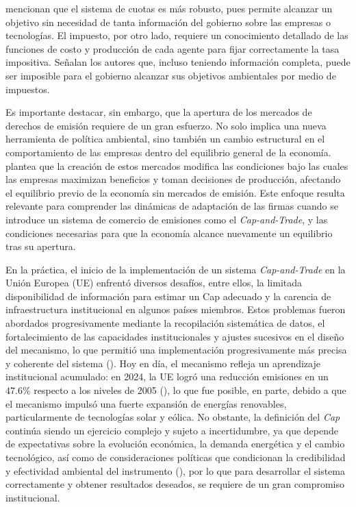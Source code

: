  mencionan que el sistema de cuotas es más robusto, pues permite alcanzar un objetivo sin necesidad de tanta información del gobierno sobre las empresas o tecnologías. El impuesto, por otro lado, requiere un conocimiento detallado de las funciones de costo y producción de cada agente para fijar correctamente la tasa impositiva. Señalan los autores que, incluso teniendo información completa, puede ser imposible para el gobierno alcanzar sus objetivos ambientales por medio de impuestos.\medskip 

Es importante destacar, sin embargo, que la apertura de los mercados de derechos de emisión requiere de un gran esfuerzo. No solo implica una nueva herramienta de política ambiental, sino también un cambio estructural en el comportamiento de las empresas dentro del equilibrio general de la economía.  plantea que la creación de estos mercados modifica las condiciones bajo las cuales las empresas maximizan beneficios y toman decisiones de producción, afectando el equilibrio previo de la economía sin mercados de emisión. Este enfoque resulta relevante para comprender las dinámicas de adaptación de las firmas cuando se introduce un sistema de comercio de emisiones como el \emph{Cap-and-Trade}, y las condiciones necesarias para que la economía alcance nuevamente un equilibrio tras su apertura.\medskip

En la práctica, el inicio de la implementación de un sistema \emph{Cap-and-Trade} en la Unión Europea (UE) enfrentó diversos desafíos, entre ellos, la limitada disponibilidad de información para estimar un Cap adecuado y la carencia de infraestructura institucional en algunos países miembros. Estos problemas fueron abordados progresivamente mediante la recopilación sistemática de datos, el fortalecimiento de las capacidades institucionales y ajustes sucesivos en el diseño del mecanismo, lo que permitió una implementación progresivamente más precisa y coherente del sistema (). Hoy en día, el mecanismo refleja un aprendizaje institucional acumulado: en 2024, la UE logró una reducción emisiones en un $47.6\%$ respecto a los niveles de 2005 (), lo que fue posible, en parte, debido a que el mecanismo impulsó una fuerte expansión de energías renovables, particularmente de tecnologías solar y eólica. No obstante, la definición del \textit{Cap} continúa siendo un ejercicio complejo y sujeto a incertidumbre, ya que depende de expectativas sobre la evolución económica, la demanda energética y el cambio tecnológico, así como de consideraciones políticas que condicionan la credibilidad y efectividad ambiental del instrumento (), por lo que para desarrollar el sistema correctamente y obtener resultados deseados, se requiere de un gran compromiso institucional.\medskip

